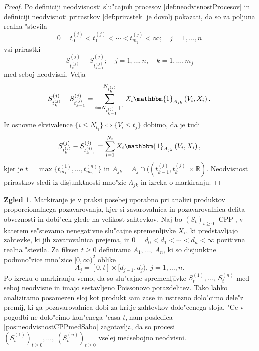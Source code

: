 \documentclass[12pt, a4paper, reqno]{amsart}
\theoremstyle{definition}
\newtheorem{zgled}[definicija]{Zgled}
\theoremstyle{plain}
\newcommand{\R}{\mathbb{R}}
\newcommand{\1}{\mathds{1}}
\DeclareMathOperator{\CPP}{CPP}
\newcommand*{\refPriloga}[1]{%
  \begingroup
    \hypersetup{
      linkcolor=red,
      linkbordercolor=red,
    }%
    \ref{#1}%
  \endgroup
}
\begin{document}
        \begin{proof}
            Po definiciji neodvisnosti slu"cajnih procesov \refPriloga{def:neodvisnostProcesov} in definiciji neodvisnoti 
            prirastkov \refPriloga{def:prirastek} je dovolj pokazati, da so za poljuna realna "stevila
            $$
                0 = t_0^{(j)} < t_1^{(j)} < \cdots < t_{m_j}^{(j)} < \infty; \quad j = 1, \dots, n
            $$
            vsi prirastki 
            $$
                S^{(j)}_{t_k^{(j)}} - S^{(j)}_{t_{k-1}^{(j)}}; \quad j = 1, \dots, n, \quad k = 1, \dots, m_j
            $$
            med seboj neodvisni. Velja 
            $$
                S^{(j)}_{t_k^{(j)}} - S^{(j)}_{t_{k-1}^{(j)}} = \sum_{i = N_{t_{k-1}^{(j)}}+1}^{N_{t_k^{(j)}}}X_i\mathbbm{1}_{A_{jk}}\left(V_i, X_i\right).
            $$
            Iz osnovne ekvivalence $\{i\leq N_{t_j}\} \iff \{V_i \leq t_j\}$ dobimo, da je tudi 
            $$
                S^{(j)}_{t_k^{(j)}} - S^{(j)}_{t_{k-1}^{(j)}} = \sum_{i = 1}^{N_t} X_i\mathbbm{1}_{A_{jk}}\left(V_i, X_i\right),
            $$
            kjer je $t = \max\{t_{m_1}^{(1)}, \dots, t_{m_n}^{(n)}\}$ in $A_{jk} = A_j \cap ((t_{k-1}^{(j)}, t_k^{(j)}]\times \R)$.
            Neodvisnost prirastkov sledi iz disjunktnosti mno"zic $A_{jk}$ in izreka o markiranju.
        \end{proof}
    
        \begin{zgled}
            Markiranje je v praksi posebej uporabno pri analizi produktov 
            proporcionalnega pozavarovanja, kjer si zavarovalnica in  
            pozavarovalnica delita obveznosti in dobi"cek glede na velikost zahtevkov. Naj bo $(S_t)_{t\geq0}$ $\CPP$,  
            v katerem se"stevamo nenegativne slu"cajne spremenljivke $X_i$, ki predstavljajo zahtevke, 
            ki jih zavarovalnica prejema, in $ 0 = d_0 < d_1 < \cdots < d_n < \infty$ pozitivna realna "stevila. 
            Za fiksen $t\geq0$ definiramo 
            $A_1, \dots, \ A_{n }$, ki so disjunktne podmno"zice  mno"zice $[0, \infty)^2$ oblike
            \begin{equation*}
                A_j = [0, t]\times [d_{j-1}, d_j), \ j = 1, \dots, n.
            \end{equation*}
            Po izreku o markiranju vemo, da so slu"cajne spremenljivke $S_t^{(1)}, \dots, \ S_t^{(n)}$ 
            med seboj neodvisne in imajo sestavljeno Poissonovo porazdelitev. Tako lahko analiziramo 
            posamezen sloj kot produkt sam zase in ustrezno dolo"cimo dele"z premij, ki ga pozavarovalnica dobi 
            za kritje zahtevkov dolo"cenega sloja. "Ce v pogodbi ne dolo"cimo kon"cnega "casa $t$,
             nam posledica \ref{pos:neodvisnostCPPmedSabo} zagotavlja, da so procesi 
            $(S_t^{(1)})_{t\geq0}, \dots, \ (S_t^{(n)})_{t\geq0}$ vselej medsebojno neodvisni.
        \end{zgled}
\end{document}
